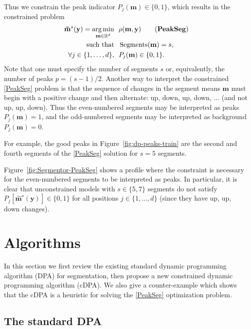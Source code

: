 \documentclass{article}
\DeclareMathOperator*{\argmin}{arg\,min}
\DeclareMathOperator*{\Segments}{Segments}
\newcommand{\RR}{\mathbb R}
\begin{document}

Thus we constrain the peak indicator $P_j(\mathbf
m)\in\{0, 1\}$, which results
in the constrained problem
\begin{align*}
  \label{PeakSeg}
  \mathbf{\tilde m}^s(\mathbf y)  =
    \argmin_{\mathbf m\in\RR^{d}} &\ \ 
    \rho(\mathbf m, \mathbf y) 
    \tag{\textbf{PeakSeg}}
\\
    \text{such that} &\ \  \Segments(\mathbf m)=s,  \\
     \forall j\in\{1, \dots, d\}, &\ \ P_j(\mathbf m) \in\{0, 1\}.
\end{align*}
Note that one must specify the number of segments $s$ or,
equivalently, the number of peaks $p=(s-1)/2$. Another way to
interpret the constrained \ref{PeakSeg} problem is that the sequence
of changes in the segment means $\mathbf m$ must begin with a positive
change and then alternate: up, down, up, down, ... (and not up, up,
down). Thus the even-numbered segments may be interpreted as peaks
$P_j(\mathbf m)=1$, and the odd-numbered segments may be interpreted
as background $P_j(\mathbf m)=0$.

For example, the good peaks in Figure~\ref{fig:dp-peaks-train} are the
second and fourth segments of the \ref{PeakSeg} solution for $s=5$
segments.

Figure~\ref{fig:Segmentor-PeakSeg} shows a profile where the constraint is
necessary for the even-numbered segments to be interpreted as
peaks. In particular, it is clear that unconstrained models with
$s\in\{5, 7\}$ segments do not satisfy $P_j[\mathbf{\hat m}^s(\mathbf
y)]\in\{0, 1\}$ for all positions $j\in\{1,\dots, d\}$ (since they
have up, up, down changes).

\section{Algorithms}
\label{sec:algorithms}

In this section we first review the existing standard dynamic
programming algorithm (DPA) for segmentation, then propose a new
constrained dynamic programming algorithm (cDPA). We also give a
counter-example which shows that the cDPA is a heuristic for solving
the \ref{PeakSeg} optimization problem.

\subsection{The standard DPA}
\end{document}
